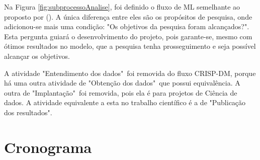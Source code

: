 Na Figura \ref{fig:subprocessoAnalise}, foi definido o fluxo de ML semelhante ao proposto por \citeauthor{BRINK2015} (\citeyear{BRINK2015}). A única diferença entre eles são os propósitos de pesquisa, onde adicionou-se mais uma condição: "Os objetivos da pesquisa foram alcançados?". Esta pergunta guiará o desenvolvimento do projeto, pois garante-se, mesmo com ótimos resultados no modelo, que a pesquisa tenha prosseguimento e seja possível alcançar os objetivos.

A atividade "Entendimento dos dados"\ foi removida do fluxo CRISP-DM, porque há uma outra atividade de "Obtenção dos dados"\ que possui equivalência. A outra de "Implantação"\ foi removida, pois ela é para projetos de Ciência de dados. A atividade equivalente a esta no trabalho científico é a de "Publicação dos resultados".

\section{Cronograma}

